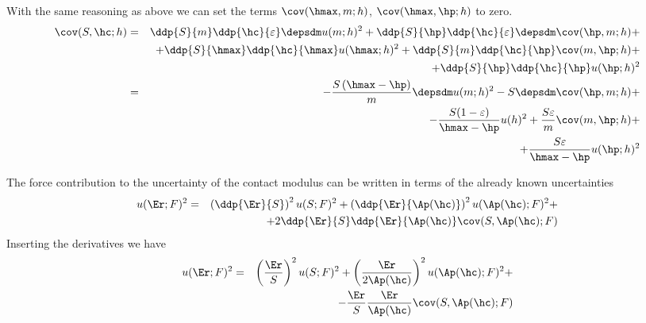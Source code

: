 With the same reasoning as above we can set the terms $\cov(\hmax,m;h)$, $\cov(\hmax, \hp;h)$ to zero.
 \begin{eqnarray*}
  \cov(S,\hc;h) 
  &=& 
  \ddp{ S }{ m} \ddp{ \hc }{ \varepsilon} \depsdm  u(m;h)^2  +
  \ddp{ S }{ \hp} \ddp{ \hc }{ \varepsilon} \depsdm  \cov(\hp, m;h) + \\
  &&+
  \ddp{ S }{ \hmax} \ddp{ \hc }{ \hmax} u(\hmax;h)^2 + 
  \ddp{ S }{ m} \ddp{ \hc }{ \hp}  \cov(m,\hp;h) +  \\
  &&+ 
  \ddp{ S }{ \hp} \ddp{ \hc }{ \hp} u(\hp;h)^2  \\ 
  &=&
   - \frac{S\left( \hmax - \hp\right)}{m}  \depsdm  u(m;h)^2  
   - S\depsdm  \cov(\hp, m;h) + \\
  &&
  -\frac{ S(1-\varepsilon) }{ \hmax-\hp}  u(h)^2 + 
  \frac{ S \varepsilon }{ m}   \cov(m,\hp;h) +  \\
  &&+ 
  \frac{ S \varepsilon}{\hmax- \hp}  u(\hp;h)^2  \\ 
    \end{eqnarray*}

The force contribution to the uncertainty of the contact modulus can be written in terms of the already known uncertainties
\begin{eqnarray*}
 u(\Er;F)^2 &=& 
 \left( \ddp{ \Er}{ S}\right)^2 u(S;F)^2 + 
 \left( \ddp{ \Er}{ \Ap(\hc)} \right)^2 u(\Ap(\hc);F)^2 + \\ 
  && + 2  \ddp{ \Er}{ S}\ddp{ \Er}{ \Ap(\hc)} \cov(S,\Ap(\hc);F)  
\end{eqnarray*}
Inserting the derivatives we have
\begin{eqnarray*}
u(\Er;F)^2 &=& 
 \left( \frac{ \Er}{ S}\right)^2 u(S;F)^2 + 
 \left( \frac{ \Er}{ 2\Ap(\hc)} \right)^2 u(\Ap(\hc);F)^2 + \\ 
  && -  \frac{ \Er}{ S}\frac{ \Er}{ \Ap(\hc)} \cov(S,\Ap(\hc);F)   
\end{eqnarray*}

